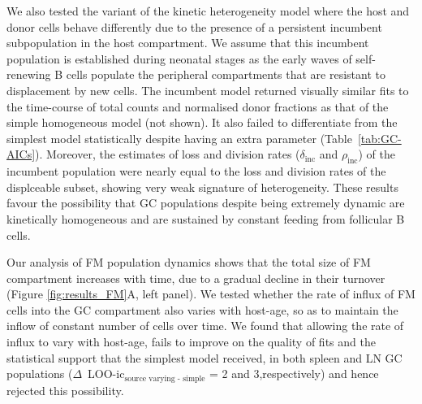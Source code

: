 \documentclass[11pt]{article}
\newcommand{\red}[1]{{\color{red}{#1}}}
\begin{document}
	We also tested the variant of the kinetic heterogeneity model where the host and donor cells behave differently due to the presence of a persistent incumbent subpopulation in the host compartment.
	We assume that this incumbent population is established during neonatal stages as the early waves of self-renewing B cells populate the peripheral compartments that are resistant to displacement by new cells.
	The incumbent model returned visually similar fits to the time-course of total counts and normalised donor fractions as that of the simple homogeneous model (not shown).
	It also failed to differentiate from the simplest model statistically despite having an extra parameter (Table~\ref{tab:GC-AICs}).
	Moreover, the estimates of loss and division rates ($\delta_{\text{inc}}$ and $\rho_{\text{inc}}$) of the incumbent population were nearly equal to the loss and division rates of the displceable subset, showing very weak signature of heterogeneity.
	These results favour the possibility that GC populations despite being extremely dynamic are kinetically homogeneous and are sustained by constant feeding from follicular B cells.
	
	
	Our analysis of FM population dynamics shows that the total size of FM compartment increases with time, due to a gradual decline in their turnover (Figure \ref{fig:results_FM}A, left panel).
	We tested whether the rate of influx of FM cells into the GC compartment also varies with host-age, so as to maintain the inflow of constant number of cells over time. 
	We found that allowing the rate of influx to vary with host-age, fails to improve on the quality of fits and the statistical support that the simplest model received, in both spleen and LN GC populations  ($\Delta$~LOO-ic$_{\text{source varying - simple}}$ = 2 and 3,respectively) and hence rejected this possibility.
	
\end{document}
